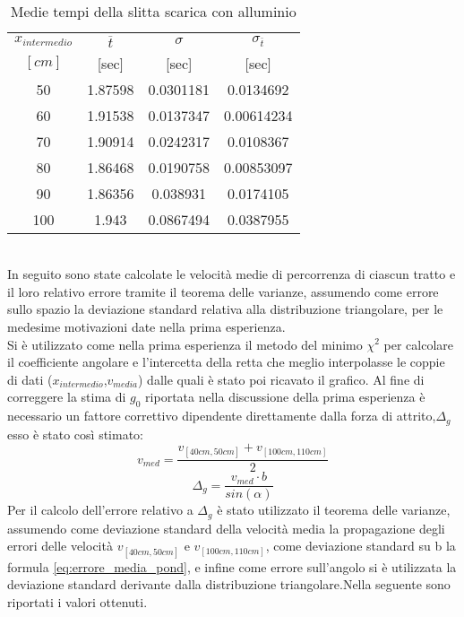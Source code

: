 \documentclass[a4paper,11pt,oneside]{article}
\begin{document}
\begin{table}[h!]
\centering
\begin{tabular}{c|ccc}
\toprule
$x_{intermedio}$&$\overline{t}$&$\sigma$&$\sigma_{\overline{t}}$\\
$[\si{cm}]$&[sec]&[sec]&[sec]\\
\midrule
50	&1.87598	&0.0301181	&0.0134692\\
60	&1.91538	&0.0137347	&0.00614234\\
70	&1.90914	&0.0242317	&0.0108367\\
80	&1.86468	&0.0190758	&0.00853097\\
90	&1.86356	&0.038931	&0.0174105\\
100	&1.943	    &0.0867494	&0.0387955\\
\bottomrule
\end{tabular}
    \caption{Medie tempi della slitta scarica con alluminio}
    \label{tab:nm_sa}
\end{table}
\\
In seguito sono state calcolate le velocità medie di percorrenza di ciascun tratto e il loro relativo errore tramite il teorema delle varianze, assumendo come errore sullo spazio la deviazione standard relativa alla distribuzione triangolare, per le medesime motivazioni date nella prima esperienza.\\
Si è utilizzato come nella prima esperienza il metodo del minimo $\chi^2$ per calcolare il coefficiente angolare e l'intercetta della retta che meglio interpolasse le coppie di dati ($x_{intermedio}$,$v_{media}$) dalle quali è stato poi ricavato il grafico. Al fine di correggere la stima di $g_0$ riportata nella discussione della prima esperienza è necessario un fattore correttivo dipendente direttamente dalla forza di attrito,$\Delta_g$ esso è stato così stimato:
\begin{equation*}
    v_{med}=\frac{v_{[40cm,50cm]}+v_{[100cm,110cm]}}{2}
\end{equation*}
\begin{equation*}
   \Delta_g=\frac{v_{med}\cdot b}{sin(\alpha)}
\end{equation*}
Per il calcolo dell'errore relativo a $\Delta_g$ è stato utilizzato il teorema delle varianze, assumendo come deviazione standard della velocità media la propagazione degli errori delle velocità  $v_{[40cm,50cm]}$ e $v_{[100cm,110cm]}$, come deviazione standard su b la formula \ref{eq:errore_media_pond},  e infine come errore sull'angolo si è utilizzata la deviazione standard derivante dalla distribuzione triangolare.Nella seguente sono riportati i valori ottenuti.
\end{document}
